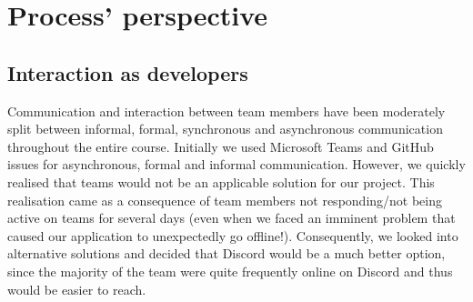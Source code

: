     \section{Process' perspective}






\subsection{Interaction as developers}
Communication and interaction between team members have been moderately split between informal, formal, synchronous and asynchronous communication throughout the entire course. Initially we used Microsoft Teams and GitHub issues for asynchronous, formal and informal communication. However, we quickly realised that teams would not be an applicable solution for our project. This realisation came as a consequence of team members not responding/not being active on teams for several days (even when we faced an imminent problem that caused our application to unexpectedly go offline!). Consequently, we looked into alternative solutions and decided that Discord would be a much better option, since the majority of the team were quite frequently online on Discord and thus would be easier to reach.\\

